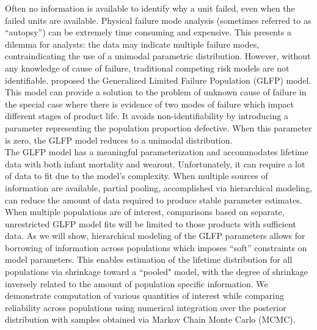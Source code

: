 \documentclass[12pt]{article}
\begin{document}
Often no information is available to identify why a unit failed, even when the failed units are available. Physical failure mode analysis (sometimes referred to as ``autopsy'') can be extremely time consuming and expensive. This presents a dilemma for analysts: the data may indicate multiple failure modes, contraindicating the use of a unimodal parametric distribution. However, without any knowledge of cause of failure, traditional competing risk models are not identifiable. \citet{chan} proposed the Generalized Limited Failure Population (GLFP) model. This model can provide a solution to the problem of unknown cause of failure in the special case where there is evidence of two modes of failure which impact different stages of product life. It avoids non-identifiability by introducing a parameter representing the population proportion defective. When this parameter is zero, the GLFP model reduces to a unimodal distribution. \\

The GLFP model has a meaningful parameterization and accommodates lifetime data with both infant mortality and wearout.  Unfortunately, it can require a lot of data to fit due to the model's complexity. When multiple sources of information are available, partial pooling, accomplished via hierarchical modeling, can reduce the amount of data required to produce stable parameter estimates. When multiple populations are of interest, comparisons based on separate, unrestricted GLFP model fits will be limited to those products with sufficient data. As we will show, hierarchical modeling of the GLFP parameters allows for borrowing of information across populations which imposes ``soft'' constraints on model parameters. This enables estimation of the lifetime distribution for all populations via shrinkage toward a ``pooled" model, with the degree of shrinkage inversely related to the amount of population specific information. We demonstrate computation of various quantities of interest while comparing reliability across populations using numerical integration over the posterior distribution with samples obtained via Markov Chain Monte Carlo (MCMC).
\end{document}
